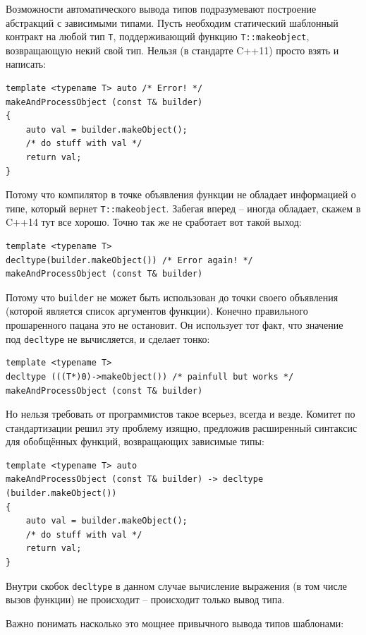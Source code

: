 \documentclass[a4paper,12pt,oneside]{article}
\begin{document}
Возможности автоматического вывода типов подразумевают построение абстракций с зависимыми типами. Пусть необходим статический шаблонный контракт на любой тип \lstinline!T!, поддерживающий функцию \lstinline!T::makeobject!, возвращающую некий свой тип. Нельзя (в стандарте C++11) просто взять и написать:

\begin{lstlisting}
template <typename T> auto /* Error! */
makeAndProcessObject (const T& builder)
{
    auto val = builder.makeObject();
    /* do stuff with val */
    return val;
}
\end{lstlisting}

Потому что компилятор в точке объявления функции не обладает информацией о типе, который вернет \lstinline!T::makeobject!. Забегая вперед -- иногда обладает, скажем в C++14 тут все хорошо. Точно так же не сработает вот такой выход:

\begin{lstlisting}
template <typename T> 
decltype(builder.makeObject()) /* Error again! */
makeAndProcessObject (const T& builder)
\end{lstlisting}

Потому что \lstinline!builder! не может быть использован до точки своего объявления (которой является список аргументов функции). Конечно правильного прошаренного пацана это не остановит. Он использует тот факт, что значение под \lstinline!decltype! не вычисляется, и сделает тонко:

\begin{lstlisting}
template <typename T> 
decltype (((T*)0)->makeObject()) /* painfull but works */
makeAndProcessObject (const T& builder)
\end{lstlisting}

Но нельзя требовать от программистов такое всерьез, всегда и везде. Комитет по стандартизации решил эту проблему изящно, предложив расширенный синтаксис для обобщённых функций, возвращающих зависимые типы:

\begin{lstlisting}
template <typename T> auto
makeAndProcessObject (const T& builder) -> decltype (builder.makeObject())
{
    auto val = builder.makeObject();
    /* do stuff with val */
    return val;
}
\end{lstlisting}

Внутри скобок \lstinline!decltype! в данном случае вычисление выражения (в том числе вызов функции) не происходит -- происходит только вывод типа.

Важно понимать насколько это мощнее привычного вывода типов шаблонами:
\end{document}
